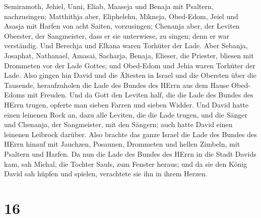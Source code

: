 Semiramoth, Jehiel, Unni, Eliab, Maaseja und Benaja mit Psaltern,
nachzusingen;  Matthithja aber, Eliphelehu, Mikneja,
Obed-Edom, Jeiel und Asasja mit Harfen von acht Saiten, vorzusingen;
 Chenanja aber, der Leviten Oberster, der Sangmeister,
dass er sie unterwiese, zu singen; denn er war verständig.
 Und Berechja und Elkana waren Torhüter der Lade.
 Aber Sebanja, Josaphat, Nathanael, Amasai, Sacharja,
Benaja, Elieser, die Priester, bliesen mit Drommeten vor der Lade
Gottes; und Obed-Edom und Jehia waren Torhüter der Lade. 
Also gingen hin David und die Ältesten in Israel und die Obersten über
die Tausende, heraufzuholen die Lade des Bundes des HErrn aus dem Hause
Obed-Edoms mit Freuden.  Und da Gott den Leviten half,
die die Lade des Bundes des HErrn trugen, opferte man sieben Farren und
sieben Widder.  Und David hatte einen leinenen Rock an,
dazu alle Leviten, die die Lade trugen, und die Sänger und Chenanja, der
Sangmeister, mit den Sängern; auch hatte David einen leinenen Leibrock
darüber.  Also brachte das ganze Israel die Lade des
Bundes des HErrn hinauf mit Jauchzen, Posaunen, Drommeten und hellen
Zimbeln, mit Psaltern und Harfen.  Da nun die Lade des
Bundes des HErrn in die Stadt Davids kam, sah Michal, die Tochter Sauls,
zum Fenster heraus; und da sie den König David sah hüpfen und spielen,
verachtete sie ihn in ihrem Herzen.

\hypertarget{section-15}{%
\section{16}\label{section-15}}

